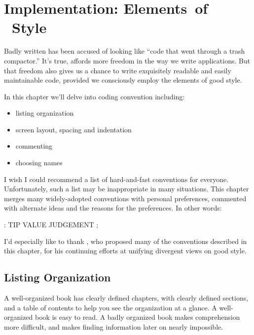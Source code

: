 
\chapter{Implementation: Elements~of \Forth{}~Style}%
%

\initial Badly written \Forth{} has been accused of looking like ``code that
went through a trash compactor.'' It's true, \Forth{} affords more
freedom in the way we write applications.  But that freedom also gives
us a chance to write exquisitely readable and easily maintainable
code, provided we consciously employ the elements of good \Forth{}
style.

In this chapter we'll delve into \Forth{} coding convention
including:

\begin{itemize}%
\item listing organization
\item screen layout, spacing and indentation
\item commenting
\item choosing names
\end{itemize}
I wish I could recommend a list of hard-and-fast conventions for
everyone.  Unfortunately, such a list may be inappropriate in many
situations.  This chapter merges many widely-adopted conventions with
personal preferences, commented with alternate ideas and the reasons
for the preferences.  In other words:
\begin{Code}
: TIP  VALUE JUDGEMENT ;
\end{Code}
I'd especially like to thank , who
proposed many of the conventions described in this chapter, for his
continuing efforts at unifying divergent views on good \Forth{} style.

\section{Listing Organization}%
%

A well-organized book has clearly defined chapters, with clearly defined
sections, and a table of contents to help you see the organization at a
glance.  A well-organized book is easy to read.  A badly organized book
makes comprehension more difficult, and makes finding information
later on nearly impossible.

